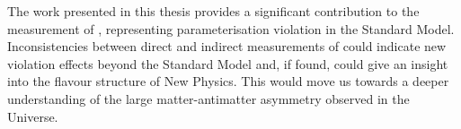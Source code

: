 The work presented in this thesis provides a significant contribution to the measurement of \Pgamma, representing parameterisation \CP violation in the Standard Model. Inconsistencies between direct and indirect measurements of \Pgamma could indicate new \CP violation effects beyond the Standard Model and, if found, could give an insight into the flavour structure of New Physics. This would move us towards a deeper understanding of the large matter-antimatter asymmetry observed in the Universe.
